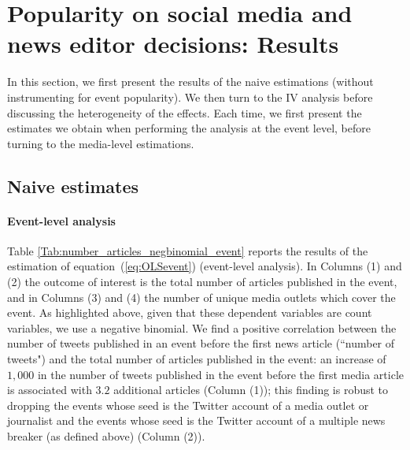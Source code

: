 \section{Popularity on social media and news editor decisions: Results\label{Sec:Results}}

In this section, we first present the results of the naive estimations (without instrumenting for event popularity). We then turn to the IV analysis before discussing the heterogeneity of the effects. Each time, we first present the estimates we obtain when performing the analysis at the event level, before turning to the media-level estimations.


\subsection{Naive estimates}

\paragraph{Event-level analysis}

Table \ref{Tab:number_articles_negbinomial_event} reports the results of the estimation of equation~(\ref{eq:OLSevent}) (event-level analysis). In Columns (1) and (2) the outcome of interest is the total number of articles published in the event, and in Columns (3) and (4) the number of unique media outlets which cover the event. As highlighted above, given that these dependent variables are count variables, we use a negative binomial. We find a positive correlation between the number of tweets published in an event before the first news article (``number of tweets") and the total number of articles published in the event: an increase of $1,000$ in the number of tweets published in the event before the first media article is associated with $3.2$ additional articles (Column (1)); this finding is robust to dropping the events whose seed is the Twitter account of a media outlet or journalist and the events whose seed is the Twitter account of a multiple news breaker (as defined above)  (Column (2)).

